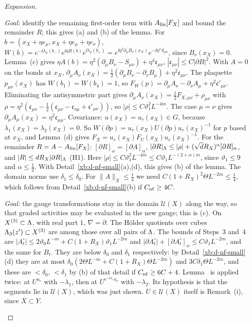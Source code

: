 \begin{proof}[Expansion]
\begin{step}
\emph{Goal:} identify the remaining first-order term with $A_{\rm lin}[F_X]$ and bound the remainder $R$; this gives (a) and (b) of the lemma.
For $b=(x_X+\eta e_\mu,x_X+\eta e_\mu+\eta e_\nu)$, $W(b)=e^{-\ii\lambda_2(b_-)}e^{\ii\eta B(b)}e^{\ii\lambda_2(b_+)}=e^{\ii\eta^2\partial_\mu B_\nu(x_X)}e^{-\ii\eta^2S_{\mu\nu}}$, since $B_\nu(x_X)=0$. Lemma~(c) gives $\eta A(b)=\eta^2(\partial_\mu B_\nu-S_{\mu\nu})+\eta^4\mathfrak c_{\mu\nu}$, $|\mathfrak c_{\mu\nu}|\le C|\partial B|^2$. With $A=0$ on the bonds at $x_X$, $\partial_\mu A_\nu(x_X)=\frac12(\partial_\mu B_\nu-\partial_\nu B_\mu)+\eta^2\mathfrak c_{\mu\nu}$. The plaquette $p_{\mu\nu}(x_X)$ has $W(b_1)=W(b_4)=1$, so $F_W(p)=\partial_\mu A_\nu-\partial_\nu A_\mu+\eta^2\mathfrak c'_{\mu\nu}$. Eliminating the antisymmetric part gives $\partial_\mu A_\nu(x_X)=\frac12F_{X,\mu\nu}+\rho_{\mu\nu}$ with $\rho=\eta^2(\mathfrak c_{\mu\nu}-\frac12(\mathfrak c_{\mu\nu}-\mathfrak c_{\nu\mu}+\mathfrak c'_{\mu\nu}))$, so $|\rho|\le C\vartheta_1^2L^{-4m}$. The case $\mu=\nu$ gives $\partial_\mu A_\mu(x_X)=\eta^2\mathfrak c_{\mu\mu}$. Covariance: $u(x_X)=u_r(x_X)\in G$, because $\lambda_1(x_X)=\lambda_2(x_X)=0$. So $W(\partial p)=u_r(x_X)U(\partial p)u_r(x_X)^{-1}$ for $p$ based at $x_X$, and Lemma~(d) gives $F_X=u_r(x_X)F_U(x_X)u_r(x_X)^{-1}$. For the remainder $R=A-A_{\rm lin}[F_X]$: $[\partial R]_\alpha=[\partial A]_\alpha$, $|\partial R|_\Lambda\le|\rho|+(\sqrt dR_X)^\alpha[\partial R]_\alpha$, and $|R|\le dR_X|\partial R|_\Lambda$ (H1). Here $|\rho|\le C\vartheta_1^2L^{-4m}\le C\vartheta_1L^{-(2+\alpha)m}$, since $\vartheta_1\le9$ and $\alpha\le\frac12$. With Detail~\ref{xb:d-nf-small}(a),(d), this gives (b) of the lemma. The domain norms use $\delta_1\le\delta_0$. For $\|A\|_X\le\frac14$ we need $C(1+R_X)^2\Theta L^{-2m}\le\frac14$, which follows from Detail~\ref{xb:d-nf-small}(b) if $C_{\rm nf}\ge4C$.
\end{step}

\begin{step}
\emph{Goal:} the gauge transformations stay in the domain $\mathcal U(X)$ along the way, so that graded activities may be evaluated in the new gauge; this is (c).
On $X^{(3)}\subset\Lambda$, with real part $1$, $\nabla=\partial$. The H\"older quotients over cubes $\Lambda_3(z')\subset X^{(3)}$ are among those over all pairs of $\Lambda$. The bounds of Steps~3 and~4 are $|A^\circ_t|\le2\vartheta_0L^{-m}+C(1+R_X)\vartheta_1L^{-2m}$ and $|\partial A^\circ_t|+[\partial A^\circ_t]_\alpha\le C\vartheta_1L^{-2m}$, and the same for $B_t$. They are below $\delta_0$ and $\delta_1$ respectively: by Detail~\ref{xb:d-nf-small}(d) they are at most $\delta_0(2\Theta L^{-m}+C(1+R_X)\Theta L^{-2m})$ and $3C\delta_1\Theta L^{-2m}$, and these are $<\delta_0$, $<\delta_1$ by (b) of that detail if $C_{\rm nf}\ge6C+4$. Lemma~ is applied twice: at $U^{u_r}$ with $-\lambda_1$, then at $U^{e^{-\ii\lambda_1}u_r}$ with $-\lambda_2$. Its hypothesis is that the segments lie in $\mathcal U(X)$, which was just shown. $U\in\mathcal U(X)$ itself is Remark~(i), since $X\subset Y$.
\end{step}


\end{proof}
